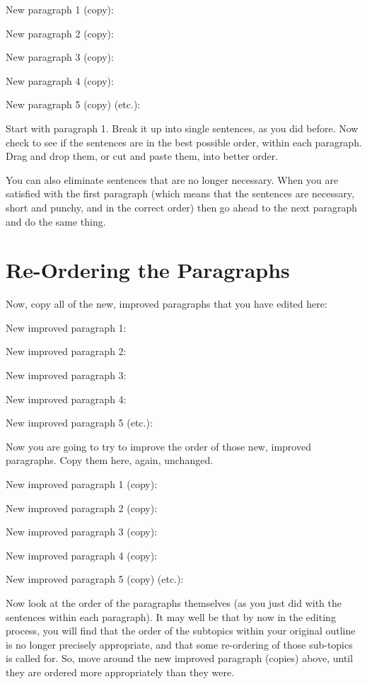 \documentclass{article}
\begin{document}
New paragraph 1 (copy):

New paragraph 2 (copy):

New paragraph 3 (copy):

New paragraph 4 (copy):

New paragraph 5 (copy) (etc.):

Start with paragraph 1. Break it up into single sentences, as you did
before. Now check to see if the sentences are in the best possible
order, within each paragraph. Drag and drop them, or cut and paste them,
into better order.

You can also eliminate sentences that are no longer necessary. When you
are satisfied with the first paragraph (which means that the sentences
are necessary, short and punchy, and in the correct order) then go ahead
to the next paragraph and do the same thing.

\section{Re-Ordering the Paragraphs}

Now, copy all of the new, improved paragraphs that you have edited here:

New improved paragraph 1:

New improved paragraph 2:

New improved paragraph 3:

New improved paragraph 4:

New improved paragraph 5 (etc.):

Now you are going to try to improve the order of those new, improved
paragraphs. Copy them here, again, unchanged.

New improved paragraph 1 (copy):

New improved paragraph 2 (copy):

New improved paragraph 3 (copy):

New improved paragraph 4 (copy):

New improved paragraph 5 (copy) (etc.):

Now look at the order of the paragraphs themselves (as you just did with
the sentences within each paragraph). It may well be that by now in the
editing process, you will find that the order of the subtopics within
your original outline is no longer precisely appropriate, and that some
re-ordering of those sub-topics is called for. So, move around the new
improved paragraph (copies) above, until they are ordered more
appropriately than they were.
\end{document}
